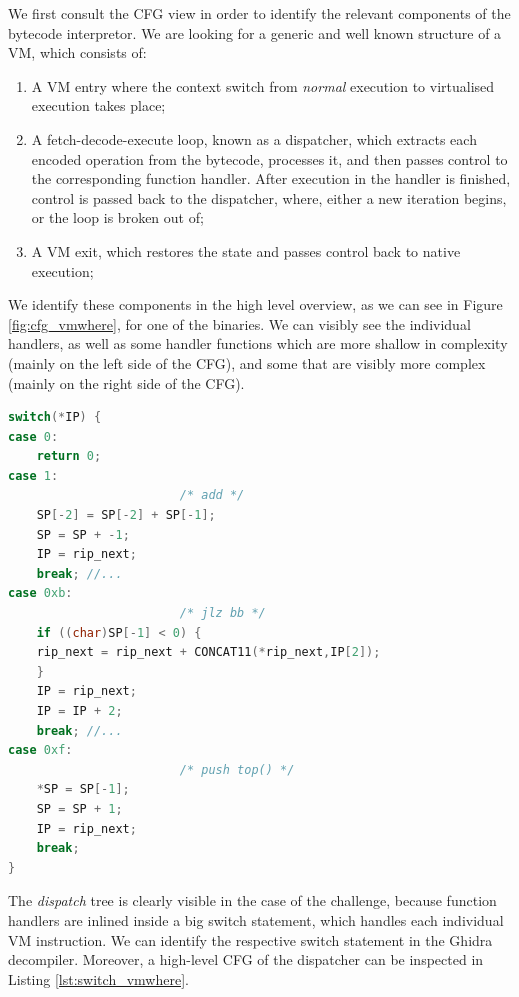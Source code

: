 We first consult the \gls{CFG} view in order to identify the relevant components of the bytecode interpretor. We are looking for a generic and well known structure of a \gls{VM}, which consists of: 
\begin{enumerate}
    \item A \gls{VM} entry where the context switch from \emph{normal} execution to virtualised execution takes place;
    \item A fetch-decode-execute loop, known as a dispatcher, which extracts each encoded operation from the bytecode, processes it, and then passes control to the corresponding function handler. After execution in the handler is finished, control is passed back to the dispatcher, where, either a new iteration begins, or the loop is broken out of;
    \item A \gls{VM} exit, which restores the state and passes control back to native execution;
\end{enumerate}

   We identify these components in the high level overview, as we can see in Figure \ref{fig:cfg_vmwhere}, for one of the binaries. We can visibly see the individual handlers, as well as some handler functions which are more shallow in complexity (mainly on the left side of the \gls{CFG}), and some that are visibly more complex (mainly on the right side of the \gls{CFG}). 

\begin{lstlisting}[language=c, label={lst:switch_vmwhere}, caption={Decompilation section of the \cc{vmwhere} dispatcher, after variable renaming and retyping. We notice the implementation of the \cc{add}, \cc{jlz} and \cc{push_top} instructions.}]
switch(*IP) {
case 0:
    return 0;
case 1:
                        /* add */
    SP[-2] = SP[-2] + SP[-1];
    SP = SP + -1;
    IP = rip_next;
    break; //...
case 0xb:
                        /* jlz bb */
    if ((char)SP[-1] < 0) {
    rip_next = rip_next + CONCAT11(*rip_next,IP[2]);
    }
    IP = rip_next;
    IP = IP + 2;
    break; //...
case 0xf:
                        /* push top() */
    *SP = SP[-1];
    SP = SP + 1;
    IP = rip_next;
    break;
}
\end{lstlisting}

The \emph{dispatch} tree is clearly visible in the case of the  challenge, because function handlers are inlined inside a big switch statement, which handles each individual \gls{VM} instruction. We can identify the respective switch statement in the Ghidra decompiler. Moreover, a high-level \gls{CFG} of the dispatcher can be inspected in Listing \ref{lst:switch_vmwhere}. 

